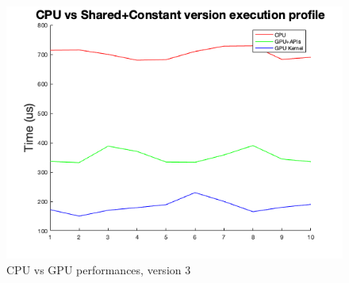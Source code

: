 \documentclass[a4paper]{report}
\begin{document}
\begin{figure}[!h]
\centering
\includegraphics[scale=0.6]{docs/cpuVSshared.png} 
\caption{CPU vs GPU performances, version 3}
\label{fig_gpu3}
\end{figure}
\end{document}

